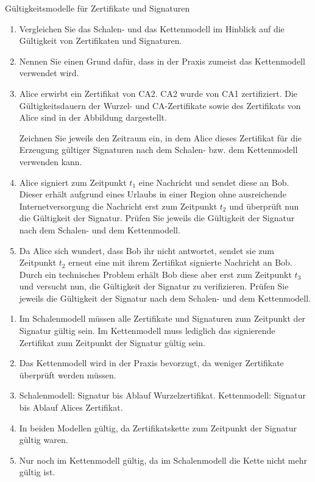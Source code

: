 \documentclass{article}
\begin{document}
\begin{exercise}{Gültigkeitsmodelle für Zertifikate und Signaturen}
  \begin{enumerate}
    \item Vergleichen Sie das Schalen- und das Kettenmodell im Hinblick auf die Gültigkeit von Zertifikaten und Signaturen.
    \item Nennen Sie einen Grund dafür, dass in der Praxis zumeist das Kettenmodell verwendet wird.
    \item Alice erwirbt ein Zertifikat von CA2. CA2 wurde von CA1 zertifiziert. Die Gültigkeitsdauern der Wurzel- und CA-Zertifikate sowie des Zertifikats von Alice sind in der Abbildung dargestellt.
      
      Zeichnen Sie jeweils den Zeitraum ein, in dem Alice dieses Zertifikat für die Erzeugung gültiger Signaturen nach dem Schalen- bzw. dem Kettenmodell verwenden kann.
    \item Alice signiert zum Zeitpunkt $t_1$ eine Nachricht und sendet diese an Bob. Dieser erhält aufgrund eines Urlaubs in einer Region ohne ausreichende Internetversorgung die Nachricht erst zum Zeitpunkt $t_2$ und überprüft nun die Gültigkeit der Signatur. Prüfen Sie jeweils die Gültigkeit der Signatur nach dem Schalen- und dem Kettenmodell.
    \item Da Alice sich wundert, dass Bob ihr nicht antwortet, sendet sie zum Zeitpunkt $t_2$ erneut eine mit ihrem Zertifikat signierte Nachricht an Bob. Durch ein technisches Problem erhält Bob diese aber erst zum Zeitpunkt $t_3$ und versucht nun, die Gültigkeit der Signatur zu verifizieren. Prüfen Sie jeweils die Gültigkeit der Signatur nach dem Schalen- und dem Kettenmodell.
  \end{enumerate}

  \begin{solution}
    \begin{enumerate}
      \item Im Schalenmodell müssen alle Zertifikate und Signaturen zum Zeitpunkt der Signatur gültig sein. Im Kettenmodell muss lediglich das signierende Zertifikat zum Zeitpunkt der Signatur gültig sein.
      \item Das Kettenmodell wird in der Praxis bevorzugt, da weniger Zertifikate überprüft werden müssen.
      \item Schalenmodell: Signatur bis Ablauf Wurzelzertifikat. Kettenmodell: Signatur bis Ablauf Alices Zertifikat.
      \item In beiden Modellen gültig, da Zertifikatskette zum Zeitpunkt der Signatur gültig waren.
      \item Nur noch im Kettenmodell gültig, da im Schalenmodell die Kette nicht mehr gültig ist.
    \end{enumerate}
  \end{solution}
\end{exercise}
\end{document}
